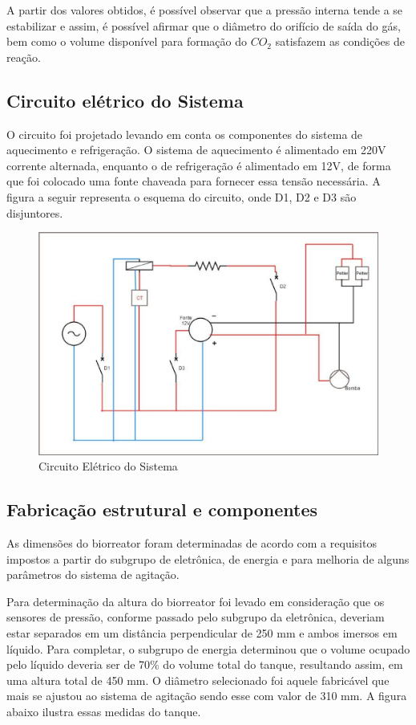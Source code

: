 A partir dos valores obtidos, é possível observar que a pressão interna tende a se estabilizar e assim, é possível afirmar que o diâmetro do orifício de saída do gás, bem como o volume disponível para formação do \(CO_{2}\)  satisfazem as condições de reação.

\subsection{Circuito elétrico do Sistema}

O circuito foi projetado levando em conta os componentes do sistema de aquecimento e refrigeração. O sistema de aquecimento é alimentado em 220V corrente alternada, enquanto o de refrigeração é alimentado em 12V, de forma que foi colocado uma fonte chaveada para fornecer essa tensão necessária. A figura a seguir representa o esquema do circuito, onde D1, D2 e D3 são disjuntores.

\begin{figure}[h]
 \centering
 \includegraphics[keepaspectratio=true,scale=0.4]{figuras/circuito.eps}
 \caption{Circuito Elétrico do Sistema}
 \label{circuito}
\end{figure}

\subsection{Fabricação estrutural e componentes}

As dimensões do biorreator foram determinadas de acordo com a requisitos impostos a partir do subgrupo de eletrônica, de energia e para melhoria de alguns parâmetros do sistema de agitação.

Para determinação da altura do biorreator foi levado em consideração que os sensores de pressão, conforme passado pelo subgrupo da eletrônica, deveriam estar separados em um distância perpendicular de 250 mm e ambos imersos em líquido. Para completar, o subgrupo de energia determinou que o volume ocupado pelo líquido deveria ser de 70\% do volume total do tanque, resultando assim, em uma altura total de 450 mm. O diâmetro selecionado foi aquele fabricável que mais se ajustou ao sistema de agitação sendo esse com valor de 310 mm. A figura abaixo ilustra essas medidas do tanque.

